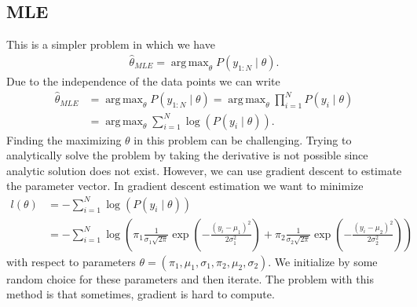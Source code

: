 \documentclass[10pt ]{article}
\DeclareMathOperator*{\argmaxA}{arg\,max}
\begin{document}
\subsection{MLE}
This is a simpler problem in which we have
\begin{align}
\hat{\theta}_{MLE} = \argmaxA_{\theta} P(y_{1:N} \mid \theta).
\end{align}
Due to the independence of the data points we can write
\begin{align}
\hat{\theta}_{MLE} &= \argmaxA_{\theta} P(y_{1:N} \mid \theta) = \argmaxA_{\theta} \prod_{i=1}^N P(y_i \mid \theta) \nonumber \\ 
&= \argmaxA_{\theta} \sum_{i=1}^N \log \left( P(y_i \mid \theta) \right).
\end{align}
 Finding the maximizing $\theta$ in this problem can be challenging. Trying to analytically solve the problem by taking the derivative is not possible since analytic solution does not exist. However, we can use gradient descent to estimate the parameter vector.  In gradient descent estimation we want to minimize
 \begin{align}
l (\theta)  &=  -\sum_{i=1}^N \log \left( P(y_i \mid \theta) \right) \nonumber \\ &= -\sum_{i=1}^N \log \left( \pi_1 \frac{1}{\sigma_1 \sqrt{2 \pi}} \exp \left( -\frac{(y_i-\mu_1)^2}{2\sigma_1^2}\right) + \pi_2 \frac{1}{\sigma_2 \sqrt{2 \pi}} \exp \left( -\frac{(y_i-\mu_2)^2}{2\sigma_2^2}\right) \right) 
\end{align}
with respect to parameters  $\theta = (\pi_1, \mu_1, \sigma_1, \pi_2, \mu_2, \sigma_2)$. We initialize by some random choice for these parameters and then iterate.  The problem with this method is that sometimes, gradient is hard to compute. 
\end{document}
